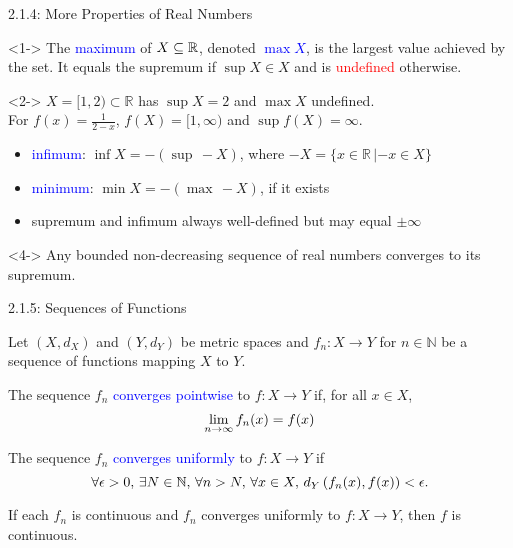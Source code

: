 \documentclass[10pt,english]{beamer}
\begin{document}
\begin{frame}{2.1.4: More Properties of Real Numbers}

\begin{definition}<1->
The \textcolor{blue}{maximum} of $X\subseteq \mathbb{R}$, denoted \textcolor{blue}{$\max X$}, is the largest value achieved by the set.
It equals the supremum if $\sup X \in X$ and is \textcolor{red}{undefined} otherwise.
\end{definition}

\begin{example}<2->
$X = [1,2) \subset \mathbb{R}$ has $\sup X = 2$ and $\max X$ undefined. \\[1mm]
For $f(x)=\frac{1}{2-x}$, $f(X) = [1,\infty)$ and $\sup f(X) = \infty$.
\end{example}

\begin{itemize}
\item<3-> \textcolor{blue}{infimum}: $\inf X = - \left(\sup \, -\!X\right)$, where $-\!X = \{x\in \mathbb{R}\,|-\!x\in X\}$
\item<3-> \textcolor{blue}{minimum}: $\min X = - \left(\max \, -\!X \right)$, if it exists
\item<3-> supremum and infimum always well-defined but may equal $\pm \infty$
\end{itemize}



\begin{theorem}<4->
Any bounded non-decreasing sequence of real numbers converges to its supremum.
\end{theorem}

\end{frame}  


\begin{frame}{2.1.5: Sequences of Functions}

Let $(X,d_X)$ and $(Y,d_Y)$ be metric spaces and
$f_n \colon X \to Y$ for $n\in \mathbb{N}$ be a sequence of functions mapping $X$ to $Y$.

\begin{definition}
The sequence $f_n$ \textcolor{blue}{converges pointwise} to $f\colon X \to Y$ if, for all $x \in X$, \vspace{-1.5mm}
\[ \lim_{n\to \infty} f_n (x) = f(x) \vspace*{-0.5mm} \]

\end{definition}

\begin{definition}
The sequence $f_n$ \textcolor{blue}{converges uniformly} to $f \colon X \to Y$ if \vspace{-1.5mm}
\[ \forall \epsilon > 0, \, \exists N\in \mathbb{N}, \, \forall n>N, \, \forall x\in X, \, d_Y \left( f_n(x),f(x) \right) < \epsilon. \vspace*{-0.5mm} \]
\end{definition}

\begin{theorem}
If each $f_n$ is continuous and $f_n$ converges uniformly to $f \colon X \to Y$, then $f$ is continuous.
\end{theorem}

\end{frame}
\end{document}
